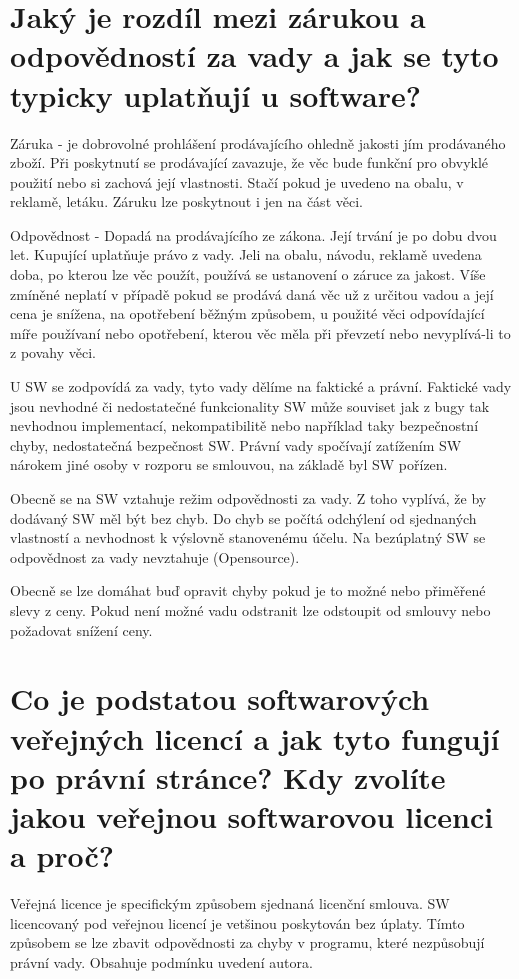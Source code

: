 \newpage
\section{Jaký je rozdíl mezi zárukou a odpovědností za vady a jak se tyto typicky uplatňují u software?}

Záruka - je dobrovolné prohlášení prodávajícího ohledně jakosti jím prodávaného zboží. Při poskytnutí se prodávající zavazuje, že věc bude funkční pro obvyklé použití nebo si zachová její vlastnosti. Stačí pokud je uvedeno na obalu, v reklamě, letáku. Záruku lze poskytnout i jen na část věci.

Odpovědnost - Dopadá na prodávajícího ze zákona. Její trvání je po dobu dvou let. Kupující uplatňuje právo z vady. Jeli na obalu, návodu, reklamě uvedena doba, po kterou lze věc použít, používá se ustanovení o záruce za jakost. Víše zmíněné neplatí v případě pokud se prodává daná věc už z určitou vadou a její cena je snížena, na opotřebení běžným způsobem, u použité věci odpovídající míře používaní nebo opotřebení, kterou věc měla při převzetí nebo nevyplívá-li to z povahy věci.

U SW se zodpovídá za vady,  tyto vady dělíme na faktické a právní. Faktické vady jsou nevhodné či nedostatečné funkcionality SW může souviset jak z bugy tak nevhodnou implementací, nekompatibilitě nebo například taky bezpečnostní chyby, nedostatečná bezpečnost SW. Právní vady spočívají zatížením SW nárokem jiné osoby v rozporu se smlouvou, na základě byl SW pořízen. 

Obecně se na SW vztahuje režim odpovědnosti za vady. Z toho vyplívá, že by dodávaný SW měl být bez chyb. Do chyb se počítá odchýlení od sjednaných vlastností a nevhodnost k výslovně stanovenému účelu. Na bezúplatný SW se odpovědnost za vady nevztahuje (Opensource). 

Obecně se lze domáhat buď opravit chyby pokud je to možné nebo přiměřené slevy z ceny. Pokud není možné vadu odstranit lze odstoupit od smlouvy nebo požadovat snížení ceny.


\vspace{0.5cm} 
\section{Co je podstatou softwarových veřejných licencí a jak tyto fungují po právní stránce? Kdy zvolíte jakou veřejnou softwarovou licenci a proč?}

Veřejná licence je specifickým způsobem sjednaná licenční smlouva. SW licencovaný pod veřejnou licencí je vetšinou poskytován bez úplaty. Tímto způsobem se lze zbavit odpovědnosti za chyby v programu, které nezpůsobují právní vady. Obsahuje podmínku uvedení autora. 

